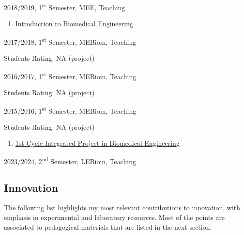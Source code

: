 \documentclass[
]{article}
\begin{document}
2018/2019, 1\textsuperscript{st} Semester, MEE, Teaching

\begin{enumerate}
\def\labelenumi{\arabic{enumi}.}
\setcounter{enumi}{27}
\item
  \ul{Introduction to Biomedical Engineering}
\end{enumerate}

2017/2018, 1\textsuperscript{st} Semester, MEBiom, Teaching

Students Rating: NA (project)

2016/2017, 1\textsuperscript{st} Semester, MEBiom, Teaching

Students Rating: NA (project)

2015/2016, 1\textsuperscript{st} Semester, MEBiom, Teaching

Students Rating: NA (project)

\begin{enumerate}
\def\labelenumi{\arabic{enumi}.}
\setcounter{enumi}{28}
\item
  \ul{1st Cycle Integrated Project in Biomedical Engineering}
\end{enumerate}

2023/2024, 2\textsuperscript{nd} Semester, LEBiom, Teaching

\subsection{Innovation}\label{innovation}

The following list highlights my most relevant contributions to
innovation, with emphasis in experimental and laboratory resources. Most
of the points are associated to pedagogical materials that are listed in
the next section.
\end{document}
